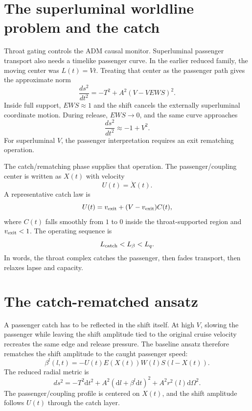 \documentclass[11pt]{article}
\newcommand{\dd}{\mathrm{d}}
\begin{document}
\section{The superluminal worldline problem and the catch}
Throat gating controls the ADM causal monitor.  Superluminal passenger transport also needs a timelike passenger curve.  In the earlier reduced family, the moving center was $L(t)=Vt$.  Treating that center as the passenger path gives the approximate norm
\begin{equation}
 \frac{ds^2}{dt^2}=-T^2+A^2\left(V-VEWS\right)^2.
 \label{eq:center_norm_old}
\end{equation}
Inside full support, $EWS\approx1$ and the shift cancels the externally superluminal coordinate motion.  During release, $EWS\to0$, and the same curve approaches
\begin{equation}
 \frac{ds^2}{dt^2}\approx -1+V^2.
\end{equation}
For superluminal $V$, the passenger interpretation requires an exit rematching operation.

The catch/rematching phase supplies that operation.  The passenger/coupling center is written as $X(t)$ with velocity
\begin{equation}
 U(t)=\dot X(t).
\end{equation}
A representative catch law is
\begin{equation}
 U(t)=v_{\rm exit}+(V-v_{\rm exit})C(t),
 \label{eq:catch_law}
\end{equation}
where $C(t)$ falls smoothly from $1$ to $0$ inside the throat-supported region and $v_{\rm exit}<1$.  The operating sequence is
\begin{equation}
 L_{\rm catch}<L_\beta<L_q.
 \label{eq:catch_order}
\end{equation}
In words, the throat complex catches the passenger, then fades transport, then relaxes lapse and capacity.

\section{The catch-rematched ansatz}
A passenger catch has to be reflected in the shift itself.  At high $V$, slowing the passenger while leaving the shift amplitude tied to the original cruise velocity recreates the same edge and release pressure.  The baseline ansatz therefore rematches the shift amplitude to the caught passenger speed:
\begin{equation}
\boxed{
 \beta^l(l,t)=-U(t)E(X(t))W(l)S(l-X(t)).
}
\label{eq:catch_rematched_shift}
\end{equation}
The reduced radial metric is
\begin{equation}
\boxed{
 ds^2=-T^2\dd t^2
 +A^2\left(\dd l+\beta^l\dd t\right)^2
 +A^2r^2(l)\dd\Omega^2.
}
\label{eq:current_metric}
\end{equation}
The passenger/coupling profile is centered on $X(t)$, and the shift amplitude follows $U(t)$ through the catch layer.
\end{document}

